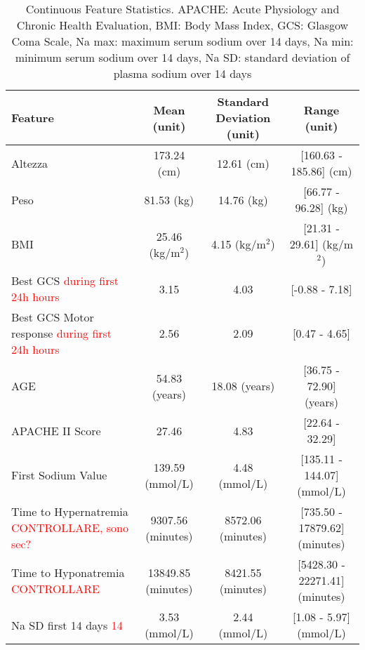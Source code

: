 \begin{table}[h!]
	\centering
	\tiny %
	\begin{tabular}{lccc}
		\hline
		\textbf{Feature} & \textbf{Mean (unit)} & \textbf{Standard Deviation (unit)} & \textbf{Range (unit)} \\ \hline
		Altezza & 173.24 (cm) & 12.61 (cm) & [160.63 - 185.86] (cm) \\
		Peso & 81.53 (kg) & 14.76 (kg) & [66.77 - 96.28] (kg) \\
		BMI & 25.46 (kg/m$^2$) & 4.15 (kg/m$^2$) & [21.31 - 29.61] (kg/m$^2$) \\
		Best GCS \textcolor{red}{during first 24h hours} & 3.15 & 4.03 & [-0.88 - 7.18] \\
		Best GCS Motor response \textcolor{red}{during first 24h hours} & 2.56 & 2.09 & [0.47 - 4.65] \\
		
		AGE  & 54.83 (years) & 18.08 (years) & [36.75 - 72.90] (years) \\
		APACHE II Score & 27.46 & 4.83 & [22.64 - 32.29] \\
		First Sodium Value & 139.59 (mmol/L) & 4.48 (mmol/L) & [135.11 - 144.07] (mmol/L) \\
		Time to Hypernatremia \textcolor{red}{CONTROLLARE, sono sec?} & 9307.56 (minutes) & 8572.06 (minutes) & [735.50 - 17879.62] (minutes) \\
		Time to Hyponatremia \textcolor{red}{CONTROLLARE} & 13849.85 (minutes) & 8421.55 (minutes) & [5428.30 - 22271.41] (minutes) \\
		Na SD first 14 days \textcolor{red}{14} & 3.53 (mmol/L) & 2.44 (mmol/L) & [1.08 - 5.97] (mmol/L) \\
		\hline
	\end{tabular}
	\caption{Continuous Feature Statistics. \footnotesize{APACHE: Acute Physiology and Chronic Health Evaluation, BMI: Body Mass Index, GCS: Glasgow Coma Scale, Na max: maximum serum sodium over 14 days, Na min: minimum serum sodium over 14 days, Na SD: standard deviation of plasma sodium over 14 days}}
	\label{tab:continuous_features}
\end{table}

